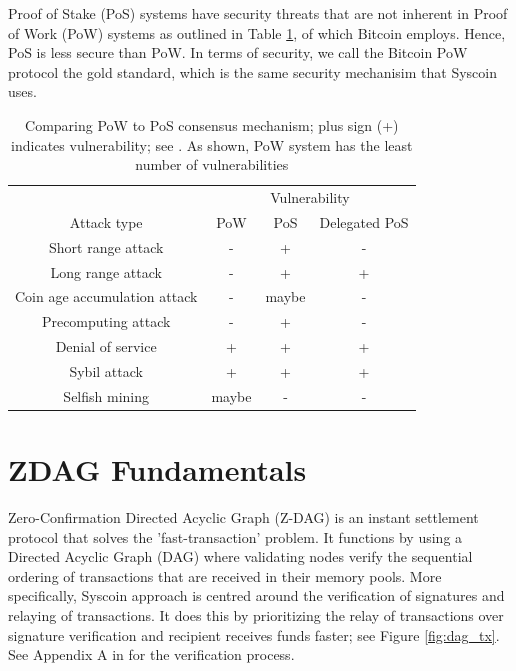 \documentclass[peerreview]{ieeesyscoin}
\begin{document}
Proof of Stake (PoS) systems have security threats that are not inherent in Proof of Work (PoW) systems as outlined in Table \ref{table:pow_vs_pos}, of which Bitcoin employs. Hence, PoS is less secure than PoW. In terms of security, we call the Bitcoin PoW protocol the gold standard, which is the same security mechanisim that Syscoin uses. 

\begin{table}[h!]
\centering
\begin{tabular}{ |c|c|c|c| } 
\hline
 & \multicolumn{3}{|c|}{ Vulnerability } \\
 Attack type & PoW & PoS & Delegated PoS \\
\hline
Short range attack & - & + & - \\
Long range attack & - & + & + \\
Coin age accumulation attack & - & maybe & - \\
Precomputing attack & - & + & - \\
Denial of service & + & + & + \\
Sybil attack & + & + & + \\
Selfish mining & maybe & - & - \\
\hline
\end{tabular}
\caption{Comparing PoW to PoS consensus mechanism; plus sign (+) indicates vulnerability; see \cite{Bit15}. As shown, PoW system has the least number of vulnerabilities}
\label{table:pow_vs_pos}
\end{table}

\section{ZDAG Fundamentals}

Zero-Confirmation Directed Acyclic Graph (Z-DAG) is an instant settlement protocol that solves the 'fast-transaction' problem. It functions by using a Directed Acyclic Graph (DAG) where validating nodes verify the sequential ordering of transactions that are received in their memory pools. More specifically, Syscoin approach is centred around the verification of signatures and relaying of transactions. It does this by prioritizing the relay of transactions over signature verification and recipient receives funds faster; see Figure \ref{fig:dag_tx}. See Appendix A in \cite{Sidb18} for the verification process.
\end{document}
